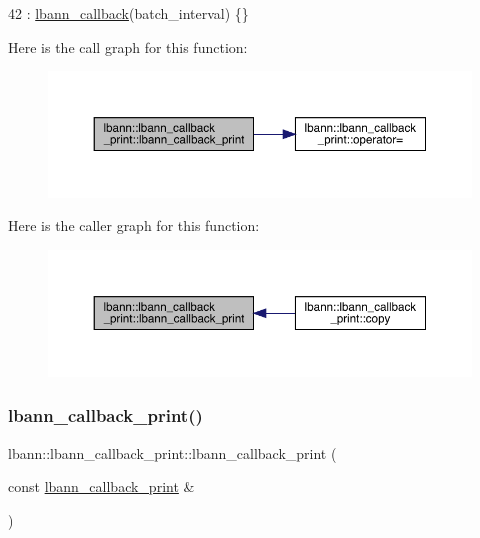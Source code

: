 \begin{DoxyCode}
42 : \hyperlink{classlbann_1_1lbann__callback_a679057298a41ddd47f08c157f756c584}{lbann\_callback}(batch\_interval) \{\}
\end{DoxyCode}
Here is the call graph for this function\+:\nopagebreak
\begin{figure}[H]
\begin{center}
\leavevmode
\includegraphics[width=350pt]{classlbann_1_1lbann__callback__print_ac31f404ac68a2cb24cd3d544d128f1d9_cgraph}
\end{center}
\end{figure}
Here is the caller graph for this function\+:\nopagebreak
\begin{figure}[H]
\begin{center}
\leavevmode
\includegraphics[width=350pt]{classlbann_1_1lbann__callback__print_ac31f404ac68a2cb24cd3d544d128f1d9_icgraph}
\end{center}
\end{figure}
\mbox{\label{classlbann_1_1lbann__callback__print_aca5b4f8a44d6194a31c08aabc59c9748}} 
\subsubsection{\texorpdfstring{lbann\+\_\+callback\+\_\+print()}{lbann\_callback\_print()}\hspace{0.1cm}{\footnotesize\ttfamily [2/2]}}
{\footnotesize\ttfamily lbann\+::lbann\+\_\+callback\+\_\+print\+::lbann\+\_\+callback\+\_\+print (\begin{DoxyParamCaption}\item[{const \hyperlink{classlbann_1_1lbann__callback__print}{lbann\+\_\+callback\+\_\+print} \&}]{ }\end{DoxyParamCaption})\hspace{0.3cm}{\ttfamily [default]}}



